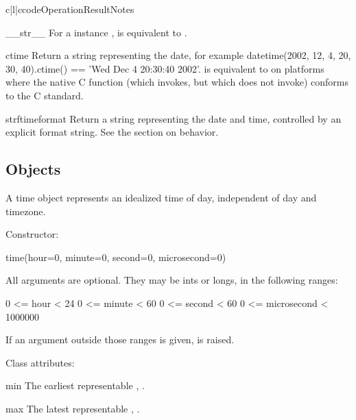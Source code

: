 \begin{tableiii}{c|l|c}{code}{Operation}{Result}{Notes}
\begin{methoddesc}{__str__}{}
    For a  instance ,  is
    equivalent to .
\end{methoddesc}

\begin{methoddesc}{ctime}{}
    Return a string representing the date, for example
    datetime(2002, 12, 4, 20, 30, 40).ctime() == 'Wed Dec  4 20:30:40 2002'.
     is equivalent to
     on platforms where
    the native C  function (which
     invokes, but which
     does not invoke) conforms to the C
    standard.
\end{methoddesc}

\begin{methoddesc}{strftime}{format}
    Return a string representing the date and time, controlled by an
    explicit format string.  See the section on 
    behavior.
\end{methoddesc}


\subsection{ Objects \label{datetime-time}}

A time object represents an idealized time of day, independent of day
and timezone.

Constructor:

    time(hour=0, minute=0, second=0, microsecond=0)

    All arguments are optional.  They may be ints or longs, in the
    following ranges:

        0 <= hour < 24
        0 <= minute < 60
        0 <= second < 60
        0 <= microsecond < 1000000

    If an argument outside those ranges is given,
     is raised.

Class attributes:

\begin{memberdesc}{min}
        The earliest representable , .
\end{memberdesc}

\begin{memberdesc}{max}
        The latest representable , .
\end{memberdesc}


\end{tableiii}
